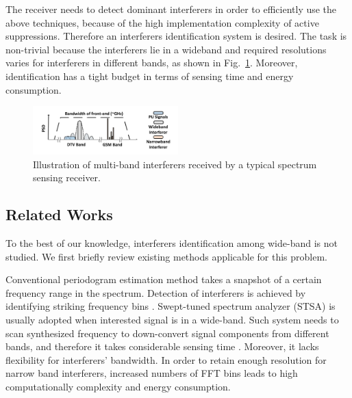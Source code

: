 \documentclass{IEEEtran}
\begin{document}
The receiver needs to detect dominant interferers in order to efficiently use the above techniques, because of the high implementation complexity of active suppressions. Therefore an interferers identification system is desired. The task is non-trivial because the interferers lie in a wideband and required resolutions varies for interferers in different bands, as shown in Fig.~\ref{fig:multiband_interferers}. Moreover, identification has a tight budget in terms of sensing time and energy consumption.


\begin{figure}
\begin{center}
\includegraphics[width=0.5\textwidth]{figure/wideband_interferers_multi_resolution}
\end{center}
\vspace{-6mm}
\caption{Illustration of multi-band interferers received by a typical spectrum sensing receiver.}
\vspace{-4mm}
\label{fig:multiband_interferers}
\end{figure}

\subsection{Related Works}
To the best of our knowledge, interferers identification among wide-band is not studied. We first briefly review existing methods applicable for this problem.

Conventional periodogram estimation method takes a snapshot of a certain frequency range in the spectrum. Detection of interferers is achieved by identifying striking frequency bins \cite{gardner1988statistical}. Swept-tuned spectrum analyzer (STSA) is usually adopted when interested signal is in a wide-band. Such system needs to scan synthesized frequency to down-convert signal components from different bands, and therefore it takes considerable sensing time \cite{6928507}. Moreover, it lacks flexibility for interferers' bandwidth. In order to retain enough resolution for narrow band interferers, increased numbers of FFT bins leads to high computationally complexity and energy consumption. 
\end{document}

